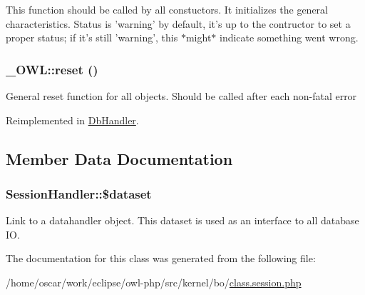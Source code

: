 This function should be called by all constuctors. It initializes the general characteristics. Status is 'warning' by default, it's up to the contructor to set a proper status; if it's still 'warning', this $\ast$might$\ast$ indicate something went wrong. \hypertarget{class__OWL_2f2a042bcf31965194c03033df0edc9b}{
\subsubsection{\setlength{\rightskip}{0pt plus 5cm}\_\-OWL::reset ()}}
\label{class__OWL_2f2a042bcf31965194c03033df0edc9b}


General reset function for all objects. Should be called after each non-fatal error 

Reimplemented in \hyperlink{classDbHandler_9982df4830f05803935bb31bac7fae3d}{DbHandler}.

\subsection{Member Data Documentation}
\hypertarget{classSessionHandler_74c46fcfbadd4c4e6bacc73ddf350056}{
\subsubsection{\setlength{\rightskip}{0pt plus 5cm}SessionHandler::\$dataset}}
\label{classSessionHandler_74c46fcfbadd4c4e6bacc73ddf350056}


Link to a datahandler object. This dataset is used as an interface to all database IO. 

The documentation for this class was generated from the following file:\begin{CompactItemize}
\item 
/home/oscar/work/eclipse/owl-php/src/kernel/bo/\hyperlink{class_8session_8php}{class.session.php}\end{CompactItemize}
